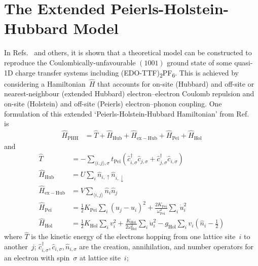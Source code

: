 
\chapter{The Extended Peierls-Holstein-Hubbard Model}
\label{ap: exPHH}

In Refs.~\cite{Ung1994, Clay2003, Seo2004, Yonemitsu2007, Onda2008} and others, it is shown that
a theoretical model can be constructed to reproduce the Coulombically-unfavourable $(1001)$ ground state
of some quasi-1D charge transfer systems including (EDO-TTF)\textsubscript{2}PF\textsubscript{6}.
%
This is achieved by considering a Hamiltonian~$\hat{H}$ that accounts for on-site (Hubbard)
and off-site or nearest-neighbour (extended Hubbard) electron--electron Coulomb repulsion and
on-site (Holstein) and off-site (Peierls) electron--phonon coupling.
%
One formulation of this extended `Peierls-Holstein-Hubbard Hamiltonian' from Ref.~\cite{Yonemitsu2007} is
%
\begin{equation}
 \begin{aligned}
   \hat{H}_\mathrm{PHH} & =
    \hat{T} + \hat{H}_\mathrm{Hub} + \hat{H}_\mathrm{ex-Hub} + \hat{H}_\mathrm{Pei} + \hat{H}_\mathrm{Hol}
 \end{aligned}
\end{equation}
%
and
%
\begin{equation}
 \begin{aligned}
   \hat{T} & = - \sum_{\langle i, j \rangle, \sigma} t_\mathrm{Pei}
     \left( \hat{c}_{i, \sigma}^\dagger \hat{c}_{j, \sigma} +  \hat{c}_{j, \sigma}^\dagger \hat{c}_{i, \sigma} \right) \\
   \hat{H}_\mathrm{Hub} & = U \sum_i \hat{n}_{i, \uparrow} \hat{n}_{i, \downarrow} \\
   \hat{H}_\mathrm{ex-Hub} & = V \sum_{\langle i, j \rangle} \hat{n}_i \hat{n}_j \\
   \hat{H}_\mathrm{Pei} & = \frac{1}{2} K_\mathrm{Pei} \sum_i \left( u_j - u_i \right)^2 + \frac{2 K_\mathrm{Pei}}{\omega_\mathrm{Pei}^2} \sum_i \dot{u}_i^2 \\
   \hat{H}_\mathrm{Hol} & = \frac{1}{2} K_\mathrm{Hol} \sum_i v_i^2 + \frac{K_\mathrm{Hol}}{2 \omega_\mathrm{Hol}^2} \sum_i \dot{u}_i^2 - g_\mathrm{Hol} \sum_i v_i \left( \hat{n}_i - \frac{1}{2} \right)
 \end{aligned}
\end{equation}
%
where $\hat{T}$ is the kinetic energy of the electrons hopping from one lattice site~$i$ to another~$j$;
$\hat{c}_{i, \sigma}^\dagger, \hat{c}_{i, \sigma}, \hat{n}_{i, \sigma}$
are the creation, annihilation, and number operators for an electron with spin~$\sigma$ at lattice site~$i$;

